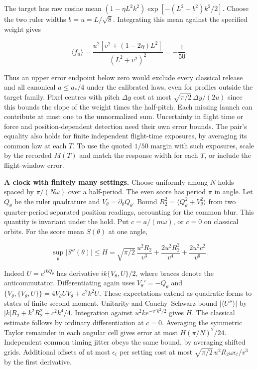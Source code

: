 \documentclass[11pt,a4paper]{article}
\begin{document}
The target has raw cosine mean \((1-\eta L^2k^2)\exp[-(L^2+b^2)k^2/2]\).
Choose the two ruler widths \(b=u=L/\sqrt8\). Integrating this mean
against the specified weight gives

\[
 \langle f_u\rangle=
 \frac{u^2[v^2+(1-2\eta)L^2]}{(L^2+v^2)^2}=-\frac1{50}.
\]

Thus an upper error endpoint below zero would exclude every classical
release and all canonical \(a\le a_*/4\) under the calibrated laws, even
for profiles outside the target family. Pixel centres with pitch
\(\Delta y\) cost at most \(\sqrt{\pi/2}\,\Delta y/(2u)\) since this
bounds the slope of the weight times the half-pitch. Each missing launch
can contribute at most one to the unnormalized sum. Uncertainty in
flight time or force and position-dependent detection need their own
error bounds. The pair's equality also holds for finite independent
flight-time exposures, by averaging its common law at each \(T\). To use
the quoted \(1/50\) margin with such exposures, scale by the recorded
\(M(T)\) and match the response width for each \(T\), or include the
flight-window error.

\textbf{A clock with finitely many settings.} Choose uniformly among
\(N\) holds spaced by \(\pi/(N\omega)\) over a half-period. The even
score has period \(\pi\) in angle. Let \(Q_\theta\) be the ruler
quadrature and \(V_\theta=\partial_\theta Q_\theta\). Bound
\(R_2^2=\langle Q_\theta^2+V_\theta^2\rangle\) from two quarter-period
separated position readings, accounting for the common blur. This
quantity is invariant under the hold. Put \(c=a/(m\omega)\), or \(c=0\)
on classical orbits. For the score mean \(S(\theta)\) at one angle,

\[
 \sup_\theta |S''(\theta)|\le H=
 \sqrt{\pi/2}\,\frac{u^2 R_2}{v^3}
 +\frac{2u^2 R_2^2}{v^4}+\frac{2u^2 c^2}{v^6}.
\]

Indeed \(U=e^{ikQ_\theta}\) has derivative \(ik\{V_\theta,U\}/2\), where
braces denote the anticommutator. Differentiating again uses
\(V_\theta'=-Q_\theta\) and
\(\{V_\theta,\{V_\theta,U\}\}=4V_\theta U V_\theta+c^2 k^2 U\). These
expectations extend as quadratic forms to states of finite second
moment. Unitarity and Cauchy--Schwarz bound \(|\langle U''\rangle|\) by
\(|k|R_2+k^2 R_2^2+c^2k^4/4\). Integration against
\(u^2 k e^{-v^2 k^2/2}\) gives \(H\). The classical estimate follows by
ordinary differentiation at \(c=0\). Averaging the symmetric Taylor
remainder in each angular cell gives error at most \(H(\pi/N)^2/24\).
Independent common timing jitter obeys the same bound, by averaging
shifted grids. Additional offsets of at most \(\epsilon_t\) per setting
cost at most \(\sqrt{\pi/2}\,u^2 R_2\omega\epsilon_t/v^3\) by the first
derivative.
\end{document}
